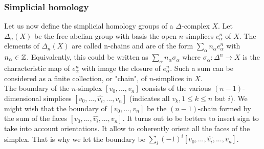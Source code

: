 \documentclass[12pt, a4paper]{article}
\begin{document}
\subsubsection{Simplicial homology}

Let us now define the simplicial homology groups of a $\Delta$-complex $X$. Let $\Delta_n(X)$ be the free abelian group with basis the open $n$-simplices $e^n_\alpha$ of $X$. The elements of $\Delta_n(X)$ are called n-chains and are of the form $\sum_\alpha n_\alpha e^n_\alpha$ with $n_\alpha \in \mathbb{Z}$. Equivalently, this could be written as $\sum_\alpha n_\alpha \sigma_\alpha$ where $\sigma_\alpha : \Delta^n \to X$ is the characteristic map of $e^n_\alpha$ with image the closure of $e^n_\alpha$. Such a sum can be considered as a finite collection, or "chain", of $n$-simplices in $X$.\\

The boundary of the $n$-simplex $[v_0, ..., v_n]$ consists of the various $(n-1)$-dimensional simplices $[v_0, ... , \hat{v_i} , ... , v_n]$ (indicates all $v_{k}, 1 \le k \le n$ but $i$). We might wish that the boundary of  $[v_0, ..., v_n]$ be the $(n-1)$-chain formed by the sum of the faces $[v_0, ... ,\hat{v_i} , ... , v_n]$. It turns out to be betters to insert sign to take into account orientations. It allow to coherently orient all the faces of the simplex. That is why we let the boundary be $\sum_i (-1)^i [v_0, ... , \hat{v_i} , ... , v_n]$.\\
\end{document}
